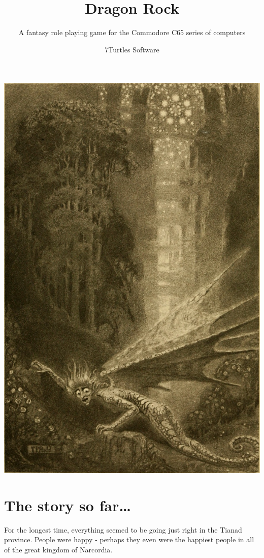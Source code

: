 \documentclass[12pt]{scrbook}
\begin{document}
\title{Dragon Rock}
\subtitle{A fantasy role playing game for the Commodore C65 series of computers}
\author{7Turtles Software}
\maketitle

\includegraphics[width=\textwidth]{illustrations/ddungeon}


\chapter*{The story so far\dots}

For the longest time, everything seemed to be going just right in the Tianad province. People were happy - perhaps they even were the happiest people in all of the great kingdom of Narcordia.
\end{document}
